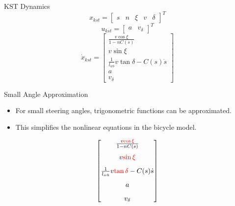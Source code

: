 \documentclass[shortpres,aspectratio=43]{beamer}
\begin{document}
\begin{frame}{KST Dynamics}
  \begin{equation}
    x_{kst}  = \begin{bmatrix}
      s & n & \xi & v & \delta
    \end{bmatrix}^T
  \end{equation}
  \begin{equation}
    u_{kst}  = \begin{bmatrix}
      a & v_\delta
    \end{bmatrix}^T
  \end{equation}
  \begin{equation}
    \dot{x}_{kst} =
    \begin{bmatrix}
      \frac{v \cos\xi}{1 - nC(s)}                \\[8pt]
      v \sin\xi                                  \\[8pt]
      \frac{1}{l_{wb}}v \tan\delta - C(s)\dot{s} \\[8pt]
      a                                          \\[8pt]
      v_\delta
    \end{bmatrix}
  \end{equation}
\end{frame}

\begin{frame}{Small Angle Approximation}
  \begin{itemize}
    \item For small steering angles, trigonometric functions can be approximated.
    \item This simplifies the nonlinear equations in the bicycle model.
  \end{itemize}
  \begin{equation}
    \begin{bmatrix}
      \frac{v \textcolor{red}{\cos\xi}}{1 - nC(s)}                \\[8pt]
      v \textcolor{red}{\sin\xi}                                  \\[8pt]
      \frac{1}{l_{wb}}v \textcolor{red}{\tan\delta} - C(s)\dot{s} \\[8pt]
      a                                                           \\[8pt]
      v_\delta
    \end{bmatrix}
  \end{equation}
\end{frame}
\end{document}
